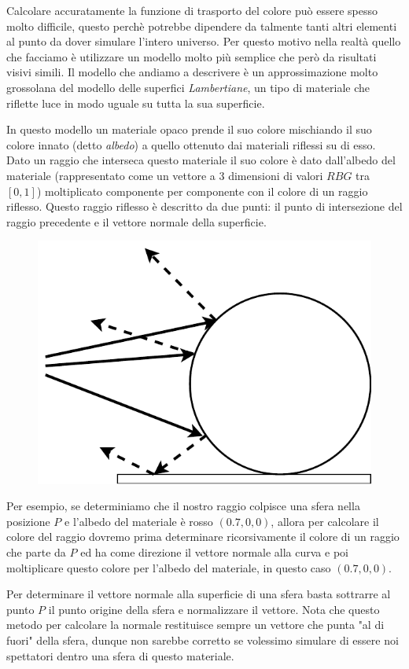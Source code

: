 \documentclass[12pt, twoside]{article}
\begin{document}
Calcolare accuratamente la funzione di trasporto del colore può essere spesso
molto difficile, questo perchè potrebbe dipendere da talmente tanti altri
elementi al punto da dover simulare l'intero universo.
Per questo motivo nella realtà quello che facciamo è utilizzare un modello
molto più semplice che però da risultati visivi simili.
Il modello che andiamo a descrivere è un approssimazione molto grossolana del
modello delle superfici \textit{Lambertiane}, un tipo di materiale che riflette
luce in modo uguale su tutta la sua superficie.

In questo modello un materiale opaco prende il suo colore mischiando il suo
colore innato (detto \textit{albedo}) a quello ottenuto dai materiali riflessi
su di esso.
Dato un raggio che interseca questo materiale il suo colore è dato dall'albedo
del materiale (rappresentato come un vettore a 3 dimensioni di valori
$RBG$ tra $[0, 1]$) moltiplicato componente per componente con il colore di un
raggio riflesso.
Questo raggio riflesso è descritto da due punti: il punto di intersezione del
raggio precedente e il vettore normale della superficie.

\begin{figure}[h]
  \centering
  \includegraphics[width=0.5\linewidth,keepaspectratio]{images/LambertianRayReflection.pdf}
\end{figure}

Per esempio, se determiniamo che il nostro raggio colpisce una sfera nella
posizione $P$ e l'albedo del materiale è rosso $(0.7, 0, 0)$, allora per
calcolare il colore del raggio dovremo prima determinare ricorsivamente il
colore di un raggio che parte da $P$ ed ha come direzione il vettore normale
alla curva e poi moltiplicare questo colore per l'albedo del materiale,
in questo caso $(0.7, 0, 0)$.

Per determinare il vettore normale alla superficie di una sfera basta
sottrarre al punto $P$ il punto origine della sfera e normalizzare il
vettore. 
Nota che questo metodo per calcolare la normale restituisce sempre un
vettore che punta "al di fuori" della sfera, dunque non sarebbe corretto
se volessimo simulare di essere noi spettatori dentro una sfera di questo
materiale.
\end{document}
